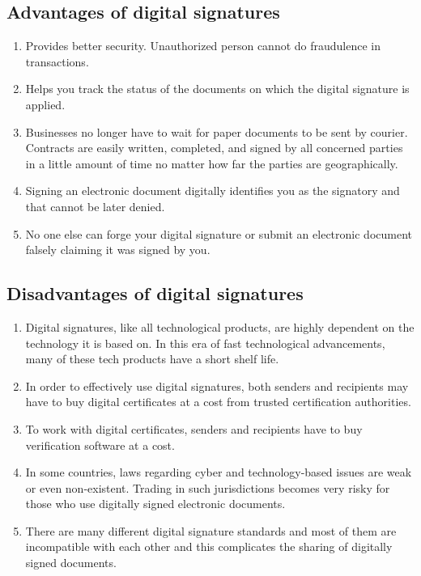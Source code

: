 \documentclass[twocolumn, 12pt, a4paper]{article}
\begin{document}
\subsection{Advantages of digital signatures}
\begin{enumerate}
  \item Provides better security. Unauthorized person cannot do fraudulence in
    transactions.
  \item Helps you track the status of the documents on which the digital
    signature is applied.
  \item Businesses no longer have to wait for paper documents to be sent by
    courier. Contracts are easily written, completed, and signed by all
    concerned parties in a little amount of time no matter how far the parties
    are geographically.
  \item Signing an electronic document digitally identifies you as the
    signatory and that cannot be later denied.
  \item No one else can forge your digital signature or submit an electronic
    document falsely claiming it was signed by you.
\end{enumerate}

\subsection{Disadvantages of digital signatures}
\begin{enumerate}
  \item Digital signatures, like all technological products, are highly
    dependent on the technology it is based on. In this era of fast
    technological advancements, many of these tech products have a short shelf
    life.
  \item In order to effectively use digital signatures, both senders and
    recipients may have to buy digital certificates at a cost from trusted
    certification authorities.
  \item To work with digital certificates, senders and recipients have to buy 
    verification software at a cost.
  \item In some countries, laws regarding cyber and technology-based issues
    are weak or even non-existent. Trading in such jurisdictions becomes very
    risky for those who use digitally signed electronic documents.
  \item There are many different digital signature standards and most of them
    are incompatible with each other and this complicates the sharing of
    digitally signed documents.
\end{enumerate}
\end{document}
